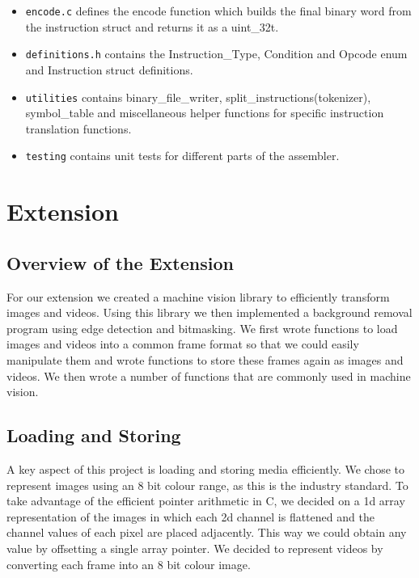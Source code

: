 \documentclass[11pt]{article}
\begin{document}
\begin{itemize}
\item \texttt{encode.c} defines the encode function which builds the final binary word from the instruction struct and returns it as a uint\_32t.

\item \texttt{definitions.h} contains the Instruction\_Type, Condition and Opcode enum and Instruction struct definitions.

\item \texttt{utilities} contains binary\_file\_writer, split\_instructions(tokenizer), symbol\_table and miscellaneous helper functions for specific instruction translation functions.

\item \texttt{testing} contains unit tests for different parts of the assembler.

\end{itemize}


  \section*{Extension}

  \subsection*{Overview of the Extension}
  For our extension we created a machine vision library to efficiently transform images and videos. Using this library we then implemented a background removal program using edge detection and bitmasking. We first wrote functions to load images and videos into a common frame format so that we could easily manipulate them and wrote functions to store these frames again as images and videos. We then wrote a number of functions that are commonly used in machine vision. 


  \subsection*{Loading and Storing}
A key aspect of this project is loading and storing media efficiently. We chose to represent images using an 8 bit colour range, as this is the industry standard. To take advantage of the efficient pointer arithmetic in C, we decided on a 1d array representation of the images in which each 2d channel is flattened and the channel values of each pixel are placed adjacently. This way we could obtain any value by offsetting a single array pointer. We decided to represent videos by converting each frame into an 8 bit colour image.
\end{document}
